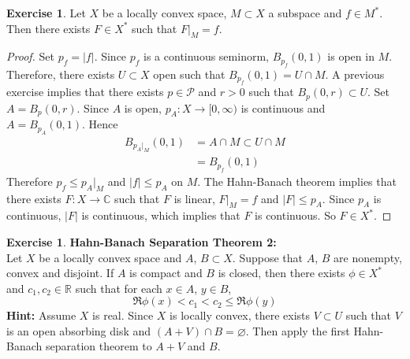 \documentclass[12pt]{amsart}
\theoremstyle{definition}
\newtheorem{ex}[definition]{Exercise}
\newcommand{\C}{\mathbb{C}}
\newcommand{\R}{\mathbb{R}}
\newcommand{\MP}{\mathcal{P}}
\newcommand{\tbf}[1]{\textbf{#1}}
\newcommand{\Rg}{[0,\infty)}
\DeclareMathOperator*{\0}{\mbf{0}}
\DeclareMathOperator*{\1}{\mbf{1}}
\begin{document}
	\begin{ex}
		Let $X$ be a locally convex space, $M \subset X$ a subspace and $f \in M^*$. Then there exists $F \in X^*$ such that $F|_M = f$.  
	\end{ex}

	\begin{proof}
		Set $p_f = |f|$. Since $p_f$ is a continuous seminorm, $B_{p_f}(0,1)$ is open in $M$. Therefore, there exists $U \subset X$ open such that $B_{p_f}(0,1) = U \cap M$. A previous exercise implies that there exists $p \in \MP$ and $r >0$ such that $B_p(0, r) \subset U$. Set $A = B_p(0, r)$. Since $A$ is open, $p_A:X \rightarrow \Rg$ is continuous and $A = B_{p_A}(0,1)$. Hence 
		\begin{align*}
			B_{p_A|_M}(0,1) 
			&= A \cap M \subset U \cap M \\
			&= B_{p_f}(0,1) 
		\end{align*}  
		Therefore $p_f \leq p_A|_M$ and $|f| \leq p_A$ on $M$. The Hahn-Banach theorem implies that there exists $F:X \rightarrow \C$ such that $F$ is linear, $F|_M = f$ and $|F| \leq p_A$. Since $p_A$ is continuous, $|F|$ is continuous, which implies that $F$ is continuous. So $F \in X^*$.  
	\end{proof}
	
	\begin{ex} \tbf{Hahn-Banach Separation Theorem 2:}\\
		Let $X$ be a locally convex space and $A$, $B \subset X$. Suppose that $A$, $B$ are nonempty, convex and disjoint. If $A$ is compact and $B$ is closed, then there exists $\phi \in X^*$ and $c_1, c_2 \in \R$ such that for each $x \in A$, $y \in B$, $$\Re \phi(x) < c_1 < c_2 \leq \Re \phi(y)$$
		\tbf{Hint:} Assume $X$ is real. Since $X$ is locally convex, there exists $V \subset U$ such that $V$ is an open absorbing disk and $(A + V) \cap B = \varnothing$. Then apply the first Hahn-Banach separation theorem to $A+V$ and $B$.
	\end{ex}
	
\end{document}
